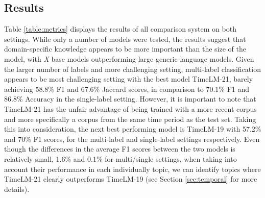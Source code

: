 \subsection{Results}
Table \ref{table:metrics} displays the results of all comparison system on both settings. While only a number of models were tested, the results suggest that domain-specific knowledge appears to be more important than the size of the model, with \textit{X} base models outperforming large generic language models. Given the larger number of labels and more challenging setting, multi-label classification appears to be most challenging setting with the best model TimeLM-21, barely achieving 58.8\% F1 and 67.6\% Jaccard scores, in comparison to 70.1\% F1 and 86.8\% Accuracy in the single-label setting. However, it is important to note that TimeLM-21 has the unfair advantage of being trained with a more recent corpus and more specifically a corpus from the same time period as the test set. Taking this into consideration, the next best performing model is TimeLM-19 with 57.2\% and 70\% F1 scores, for the multi-label and single-label settings respectively. Even though the differences in the average F1 scores between the two models is relatively small, 1.6\% and 0.1\% for multi/single settings, when taking into account their performance in each individually topic, we can identify topics where TimeLM-21 clearly outperforms TimeLM-19 (see Section \ref{sec:temporal} for more details).


